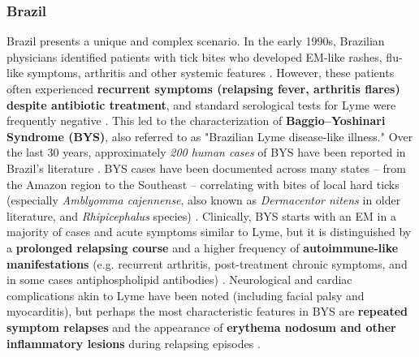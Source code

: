 \documentclass[11pt,letterpaper]{article}
\begin{document}
\subsubsection{Brazil}
Brazil presents a unique and complex scenario. In the early 1990s, Brazilian physicians identified patients with tick bites who developed EM-like rashes, flu-like symptoms, arthritis and other systemic features \citep{Yoshinari2022g}. However, these patients often experienced \textbf{recurrent symptoms (relapsing fever, arthritis flares) despite antibiotic treatment}, and standard serological tests for Lyme were frequently negative \citep{Yoshinari2022h, Yoshinari2022i}. This led to the characterization of \textbf{Baggio–Yoshinari Syndrome (BYS)}, also referred to as "Brazilian Lyme disease-like illness." Over the last 30 years, approximately \textit{200 human cases} of BYS have been reported in Brazil's literature \citep{Labruna2024}. BYS cases have been documented across many states – from the Amazon region to the Southeast – correlating with bites of local hard ticks (especially \textit{Amblyomma cajennense}, also known as \textit{Dermacentor nitens} in older literature, and \textit{Rhipicephalus} species) \citep{Yoshinari2022j, Yoshinari2022k}. Clinically, BYS starts with an EM in a majority of cases and acute symptoms similar to Lyme, but it is distinguished by a \textbf{prolonged relapsing course} and a higher frequency of \textbf{autoimmune-like manifestations} (e.g. recurrent arthritis, post-treatment chronic symptoms, and in some cases antiphospholipid antibodies) \citep{Yoshinari2022l, Yoshinari2022m}. Neurological and cardiac complications akin to Lyme have been noted (including facial palsy and myocarditis), but perhaps the most characteristic features in BYS are \textbf{repeated symptom relapses} and the appearance of \textbf{erythema nodosum and other inflammatory lesions} during relapsing episodes \citep{Yoshinari2022n, Yoshinari2022o}.
\end{document}
